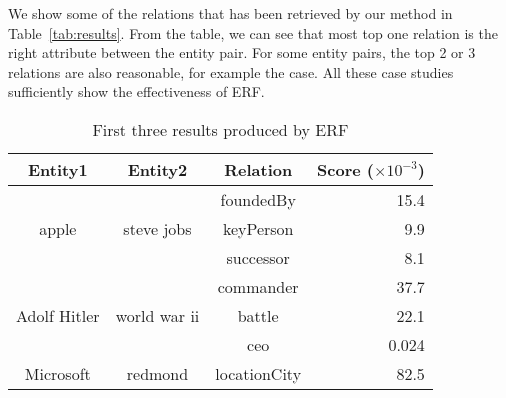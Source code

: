 We show some of the relations that has been retrieved by our method in Table~\ref{tab:results}.
From the table, we can see that most top one relation is the right attribute between the entity pair.
For some entity pairs, the top 2 or 3 relations are also reasonable, for example the  case.
All these case studies sufficiently show the effectiveness of ERF.
\begin{table}[!t]
  \centering
  \caption{First three results produced by ERF}
  \small
    \begin{tabular}{cccr}
    \toprule
    Entity1 & Entity2 & Relation & Score ($\times10^{-3}$) \\
    \midrule
    \multicolumn{1}{c}{\multirow{3}{*}{\parbox{1cm}{\centering apple}}} & \multicolumn{1}{c}{\multirow{3}[0]{*}{steve jobs}} & foundedBy & 15.4 \\
    \multicolumn{1}{c}{} & \multicolumn{1}{c}{} & keyPerson & 9.9 \\
    \multicolumn{1}{c}{} & \multicolumn{1}{c}{} & successor & 8.1 \\
    \hline
    \multicolumn{1}{c}{\multirow{3}{*}{\parbox{1cm}{\centering\small\vspace{-1.6mm}  Adolf Hitler}}} & \multicolumn{1}{c}{\multirow{3}[0]{*}{world war ii}} & commander & 37.7 \\
    \multicolumn{1}{c}{} & \multicolumn{1}{c}{} & battle & 22.1 \\
    \multicolumn{1}{c}{} & \multicolumn{1}{c}{} & ceo   & 0.024 \\
    \hline
    \multicolumn{1}{c}{\multirow{3}{*}{\parbox{1cm}{\centering Microsoft}}} & \multicolumn{1}{c}{\multirow{3}[0]{*}{redmond}} & locationCity & 82.5 \\

\end{tabular}
\end{table}
